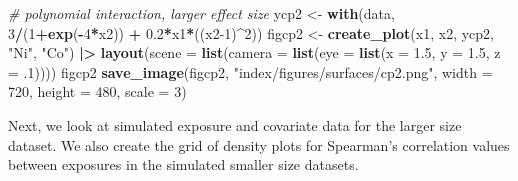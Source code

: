 \documentclass[12pt, twoside]{amherstthesis}
\newenvironment{Shaded}{\begin{snugshade}}{\end{snugshade}}
\newcommand{\AttributeTok}[1]{\textcolor[rgb]{0.13,0.29,0.53}{#1}}
\newcommand{\CommentTok}[1]{\textcolor[rgb]{0.56,0.35,0.01}{\textit{#1}}}
\newcommand{\DecValTok}[1]{\textcolor[rgb]{0.00,0.00,0.81}{#1}}
\newcommand{\FloatTok}[1]{\textcolor[rgb]{0.00,0.00,0.81}{#1}}
\newcommand{\FunctionTok}[1]{\textcolor[rgb]{0.13,0.29,0.53}{\textbf{#1}}}
\newcommand{\NormalTok}[1]{#1}
\newcommand{\OtherTok}[1]{\textcolor[rgb]{0.56,0.35,0.01}{#1}}
\newcommand{\SpecialCharTok}[1]{\textcolor[rgb]{0.81,0.36,0.00}{\textbf{#1}}}
\newcommand{\StringTok}[1]{\textcolor[rgb]{0.31,0.60,0.02}{#1}}
\begin{document}
\begin{Shaded}
\begin{Highlighting}[]
\CommentTok{\# polynomial interaction, larger effect size}
\NormalTok{ycp2 }\OtherTok{\textless{}{-}} \FunctionTok{with}\NormalTok{(data, }\DecValTok{3}\SpecialCharTok{/}\NormalTok{(}\DecValTok{1}\SpecialCharTok{+}\FunctionTok{exp}\NormalTok{(}\SpecialCharTok{{-}}\DecValTok{4}\SpecialCharTok{*}\NormalTok{x2)) }\SpecialCharTok{+} \FloatTok{0.2}\SpecialCharTok{*}\NormalTok{x1}\SpecialCharTok{*}\NormalTok{((x2}\DecValTok{{-}1}\NormalTok{)}\SpecialCharTok{\^{}}\DecValTok{2}\NormalTok{))}
\NormalTok{figcp2 }\OtherTok{\textless{}{-}} \FunctionTok{create\_plot}\NormalTok{(x1, x2, ycp2, }\StringTok{"Ni"}\NormalTok{, }\StringTok{"Co"}\NormalTok{) }\SpecialCharTok{|\textgreater{}} 
  \FunctionTok{layout}\NormalTok{(}\AttributeTok{scene =} \FunctionTok{list}\NormalTok{(}\AttributeTok{camera =} \FunctionTok{list}\NormalTok{(}\AttributeTok{eye =} \FunctionTok{list}\NormalTok{(}\AttributeTok{x =} \FloatTok{1.5}\NormalTok{, }\AttributeTok{y =} \FloatTok{1.5}\NormalTok{, }\AttributeTok{z =}\NormalTok{ .}\DecValTok{1}\NormalTok{))))}
\NormalTok{figcp2}
\FunctionTok{save\_image}\NormalTok{(figcp2, }\StringTok{"index/figures/surfaces/cp2.png"}\NormalTok{, }
           \AttributeTok{width =} \DecValTok{720}\NormalTok{, }\AttributeTok{height =} \DecValTok{480}\NormalTok{, }\AttributeTok{scale =} \DecValTok{3}\NormalTok{)}
\end{Highlighting}
\end{Shaded}
\normalsize

Next, we look at simulated exposure and covariate data for the larger size dataset. We also create the grid of density plots for Spearman's correlation values between exposures in the simulated smaller size datasets.
\end{document}
